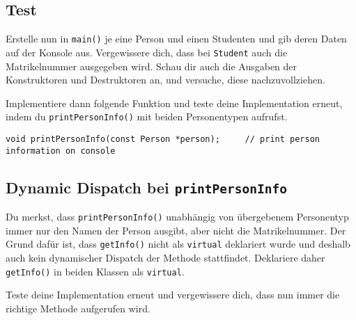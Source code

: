 
\subsection{Test}
Erstelle nun in \texttt{main()} je eine Person und einen Studenten und gib deren Daten auf der Konsole aus.
Vergewissere dich, dass bei \texttt{Student} auch die Matrikelnummer ausgegeben wird.
Schau dir auch die Ausgaben der Konstruktoren und Destruktoren an, und versuche, diese nachzuvollziehen.

Implementiere dann folgende Funktion und teste deine Implementation erneut, indem du \texttt{printPersonInfo()} mit beiden Personentypen aufrufst.

\begin{lstlisting}
void printPersonInfo(const Person *person);		// print person information on console
\end{lstlisting}



\subsection{Dynamic Dispatch bei \texttt{printPersonInfo}}
Du merkst, dass \texttt{printPersonInfo()} unabhängig von übergebenem Personentyp immer nur den Namen der Person ausgibt, aber nicht die Matrikelnummer.
Der Grund dafür ist, dass \texttt{getInfo()} nicht als \texttt{virtual} deklariert wurde und deshalb auch kein dynamischer Dispatch der Methode stattfindet.
Deklariere daher \texttt{getInfo()} in beiden Klassen als \texttt{virtual}.

Teste deine Implementation erneut und vergewissere dich, dass nun immer die richtige Methode aufgerufen wird.

